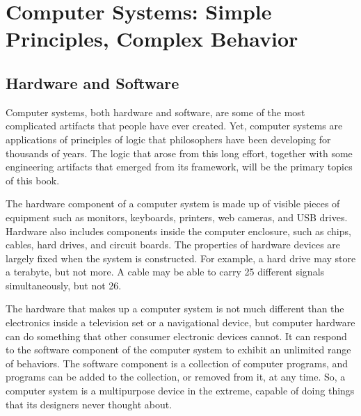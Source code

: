\chapter[Computer Systems: Simple Principles Lead to Complex Behavior][Computer Systems]{Computer Systems: Simple Principles, Complex Behavior}

\section{Hardware and Software}

Computer systems, both hardware and software, are some of the
most complicated artifacts that people have ever created.
Yet, computer systems are
applications of principles of logic that philosophers
have been developing for thousands of years.
The logic that arose from this long effort,
together with some engineering artifacts
that emerged from its framework,
will be the primary topics of this book.

The hardware component of a computer system is made up of visible
pieces of equipment such as monitors,
keyboards, printers, web cameras, and USB drives.
Hardware also includes components inside the computer enclosure,
such as chips, cables, hard drives, and circuit boards.
The properties of hardware devices are largely fixed when the system is
constructed. For example, a hard drive may store a terabyte, but not more.
A cable may be able to carry 25 different signals
simultaneously, but not 26.

The hardware that makes up a computer system is not much different
than the electronics inside a television set or a navigational device,
but computer hardware can do something that other
consumer electronic devices cannot.
It can respond to  the software component of the computer system
to exhibit an unlimited range of behaviors.
The software component is a collection of computer programs,
and programs can be added to the collection, or removed from it,
at any time.
So, a computer system is a multipurpose device in the extreme,
capable of doing things that its designers never thought about.

